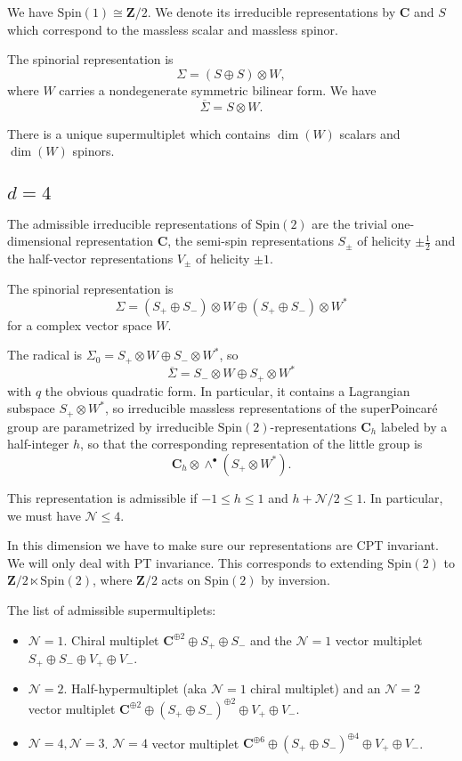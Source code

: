 \documentclass[12pt]{amsart}
\newcommand{\C}{\mathbf{C}}
\newcommand{\cN}{\mathcal{N}}
\newcommand{\Z}{\mathbf{Z}}
\newcommand{\Spin}{\mathrm{Spin}}
\theoremstyle{definition}
\theoremstyle{remark}
\begin{document}
We have $\Spin(1)\cong \Z/2$. We denote its irreducible representations by $\C$ and $S$ which correspond to the massless scalar and massless spinor.

The spinorial representation is
\[\Sigma = (S\oplus S)\otimes W,\]
where $W$ carries a nondegenerate symmetric bilinear form. We have
\[\overline{\Sigma} = S\otimes W.\]

There is a unique supermultiplet which contains $\dim(W)$ scalars and $\dim(W)$ spinors.

\subsection{$d=4$}

The admissible irreducible representations of $\Spin(2)$ are the trivial one-dimensional representation $\C$, the semi-spin representations $S_{\pm}$ of helicity $\pm\frac{1}{2}$ and the half-vector representations $V_{\pm}$ of helicity $\pm 1$.

The spinorial representation is
\[\Sigma = (S_+\oplus S_-)\otimes W\oplus (S_+\oplus S_-)\otimes W^*\]
for a complex vector space $W$.

The radical is $\Sigma_0 = S_+\otimes W\oplus S_-\otimes W^*$, so
\[\overline{\Sigma} = S_-\otimes W\oplus S_+\otimes W^*\]
with $q$ the obvious quadratic form. In particular, it contains a Lagrangian subspace $S_+\otimes W^*$, so irreducible massless representations of the superPoincar\'{e} group are parametrized by irreducible $\Spin(2)$-representations $\C_h$ labeled by a half-integer $h$, so that the corresponding representation of the little group is
\[\C_h\otimes \wedge^\bullet(S_+\otimes W^*).\]

This representation is admissible if $-1\leq h\leq 1$ and $h+\cN/2\leq 1$. In particular, we must have $\cN\leq 4$.

In this dimension we have to make sure our representations are CPT invariant. We will only deal with PT invariance. This corresponds to extending $\Spin(2)$ to $\Z/2\ltimes \Spin(2)$, where $\Z/2$ acts on $\Spin(2)$ by inversion.

The list of admissible supermultiplets:
\begin{itemize}
\item $\cN=1$. Chiral multiplet $\C^{\oplus 2}\oplus S_+\oplus S_-$ and the $\cN=1$ vector multiplet $S_+\oplus S_-\oplus V_+\oplus V_-$.

\item $\cN=2$. Half-hypermultiplet (aka $\cN=1$ chiral multiplet) and an $\cN=2$ vector multiplet $\C^{\oplus 2}\oplus (S_+\oplus S_-)^{\oplus 2}\oplus V_+\oplus V_-$.

\item $\cN=4, \cN=3$. $\cN=4$ vector multiplet $\C^{\oplus 6}\oplus (S_+\oplus S_-)^{\oplus 4}\oplus V_+\oplus V_-$.
\end{itemize}
\end{document}
